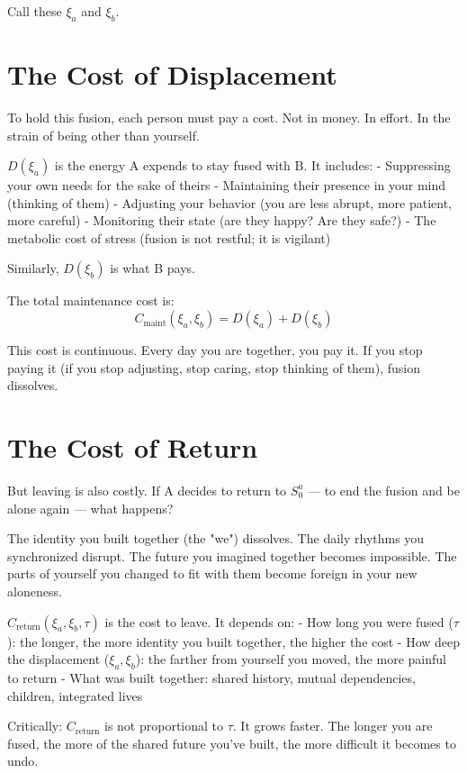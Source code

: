 \documentclass[12pt]{article}
\begin{document}
Call these $\xi_a$ and $\xi_b$.

\section{The Cost of Displacement}

To hold this fusion, each person must pay a cost. Not in money. In effort. In the strain of being other than yourself.

$D(\xi_a)$ is the energy A expends to stay fused with B. It includes:
- Suppressing your own needs for the sake of theirs
- Maintaining their presence in your mind (thinking of them)
- Adjusting your behavior (you are less abrupt, more patient, more careful)
- Monitoring their state (are they happy? Are they safe?)
- The metabolic cost of stress (fusion is not restful; it is vigilant)

Similarly, $D(\xi_b)$ is what B pays.

The total maintenance cost is:
\[
C_{\text{maint}}(\xi_a, \xi_b) = D(\xi_a) + D(\xi_b)
\]

This cost is continuous. Every day you are together, you pay it. If you stop paying it (if you stop adjusting, stop caring, stop thinking of them), fusion dissolves.

\section{The Cost of Return}

But leaving is also costly. If A decides to return to $S_0^a$ — to end the fusion and be alone again — what happens?

The identity you built together (the "we") dissolves. The daily rhythms you synchronized disrupt. The future you imagined together becomes impossible. The parts of yourself you changed to fit with them become foreign in your new aloneness.

$C_{\text{return}}(\xi_a, \xi_b, \tau)$ is the cost to leave. It depends on:
- How long you were fused ($\tau$): the longer, the more identity you built together, the higher the cost
- How deep the displacement ($\xi_a, \xi_b$): the farther from yourself you moved, the more painful to return
- What was built together: shared history, mutual dependencies, children, integrated lives

Critically: $C_{\text{return}}$ is not proportional to $\tau$. It grows faster. The longer you are fused, the more of the shared future you've built, the more difficult it becomes to undo.
\end{document}

